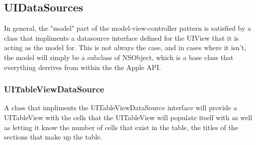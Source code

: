 \documentclass[se]{uw-wkrpt}
\begin{document}
\subsection{UIDataSources}

In general, the "model" part of the model-view-controller pattern is 
satisfied by a class that impliments a datasource interface defined for
the UIView that it is acting as the model for. This is not always
the case, and in cases where it isn't, the model will simply be a 
subclass of NSObject, which is a base class that everything derrives from
within the the Apple API.

\subsubsection{UITableViewDataSource}

A class that impliments the UITableViewDataSource interface will provide
a UITableView with the cells that the UITableView will populate itself with
as well as letting it know the number of cells that exist in the table,
the titles of the sections that make up the table.
\end{document}
